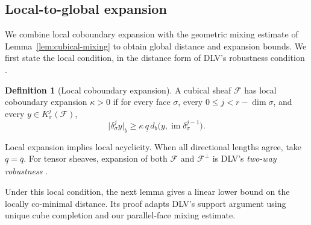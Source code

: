 \documentclass[11pt,letterpaper]{article}
\renewcommand{\le}{\leqslant}
\renewcommand{\ge}{\geqslant}
\theoremstyle{definition}
\newtheorem{definition}[theorem]{Definition}
\theoremstyle{remark}
\newcommand{\cF}{\mathcal F}
\newcommand{\im}{\operatorname{im}}
\newcommand{\db}{d_b}
\begin{document}
\subsection{Local-to-global expansion}
\label{sec:local-robustness}\label{sec:sheaf-criterion}

We combine local coboundary expansion with the geometric mixing
estimate of Lemma~\ref{lem:cubical-mixing} to obtain global distance
and expansion bounds. We first state the local condition, in the
distance form of DLV's robustness condition
\cite[Definition~5.6 and Remark~5.7]{DinurLinVidick2024}.

\begin{definition}[Local coboundary expansion]
\label{def:local-coboundary-expansion}
A cubical sheaf $\cF$ has local coboundary expansion $\kappa>0$ if for
every face $\sigma$, every $0\le j<r-\dim\sigma$, and every
$y\in K_\sigma^j(\cF)$,
\begin{equation}
 \bigl|\delta_\sigma^j y\bigr|_b\ge
 \kappa\,\underline q\,\db\bigl(y,\im\delta_\sigma^{j-1}\bigr).
 \label{eq:local-coboundary-expansion}
\end{equation}
\end{definition}

Local expansion implies local acyclicity.
When all directional lengths agree, take $\underline q=\overline q$.
For tensor sheaves, expansion of both
$\cF$ and $\cF^\perp$ is DLV's \emph{two-way robustness}
\cite[Definition~5.9]{DinurLinVidick2024}.


Under this local condition, the next lemma gives a linear lower
bound on the locally co-minimal distance. Its proof adapts DLV's
support argument using unique cube completion and our parallel-face
mixing estimate.
\end{document}
